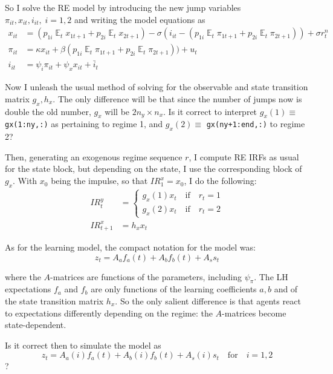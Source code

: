 \documentclass[11pt]{article}
\renewcommand{\[}{\begin{equation}}
\renewcommand{\]}{\end{equation}}
\DeclareMathOperator{\E}{\mathbb{E}}
\begin{document}
So I solve the RE model by introducing the new jump variables $\pi_{it}, x_{it}, i_{it}, \; i =1,2$ and writing the model equations as
\begin{align}
x_{it} &=  (p_{1i}\E_t x_{1t+1} +p_{2i}\E_t x_{2t+1})  - \sigma(i_{it} - (p_{1i}\E_t \pi_{1t+1} +p_{2i}\E_t \pi_{2t+1})) +\sigma r_t^n   \\
\pi_{it} &= \kappa x_{it} +\beta (p_{1i}\E_t \pi_{1t+1} +p_{2i}\E_t \pi_{2t+1})) + u_t   \\
i_{it} &= \psi_{i}\pi_{it} + \psi_{x} x_{it}  + \bar{i}_t \label{TR}
\end{align}

Now I unleash the usual method of solving for the observable and state transition matrix $g_x, h_x$. The only difference will be that since the number of jumps now is double the old number, $g_x$ will be $2n_y \times n_x$. Is it correct to interpret $g_{x}(1) \equiv$ \texttt{gx(1:ny,:)} as pertaining to regime 1, and $g_{x}(2) \equiv$ \texttt{gx(ny+1:end,:)} to regime 2?

Then, generating an exogenous regime sequence $r$, I compute RE IRFs as usual for the state block, but depending on the state, I use the corresponding block of $g_x$. With $x_0$ being the impulse, so that $IR^x_1 = x_0$, I do the following:
\begin{align}
IR^y_t & = \begin{cases} g_{x}(1) x_t \quad \text{if} \quad r_t =1 \\ g_{x}(2) x_t \quad \text{if} \quad r_t =2 \end{cases} \\
IR^x_{t+1} & = h_x x_t 
\end{align}

As for the learning model, the compact notation for the model was:
\begin{equation}
z_t  = A_a f_a(t) + A_b f_b(t) + A_s s_t \label{LOM_LR} 
\end{equation}

where the $A$-matrices are functions of the parameters, including $\psi_{\pi}$. The LH expectations $f_a$ and $f_b$ are only functions of the learning coefficients $a,b$ and of the state transition matrix $h_x$. So the only salient difference is that agents react to expectations differently depending on the regime: the $A$-matrices become state-dependent.

Is it correct then to simulate the model as
\begin{equation}
z_t  = A_a(i) f_a(t) + A_b(i) f_b(t) + A_s(i) s_t \quad \text{for} \quad  i=1,2 
\end{equation}
?
\end{document}
